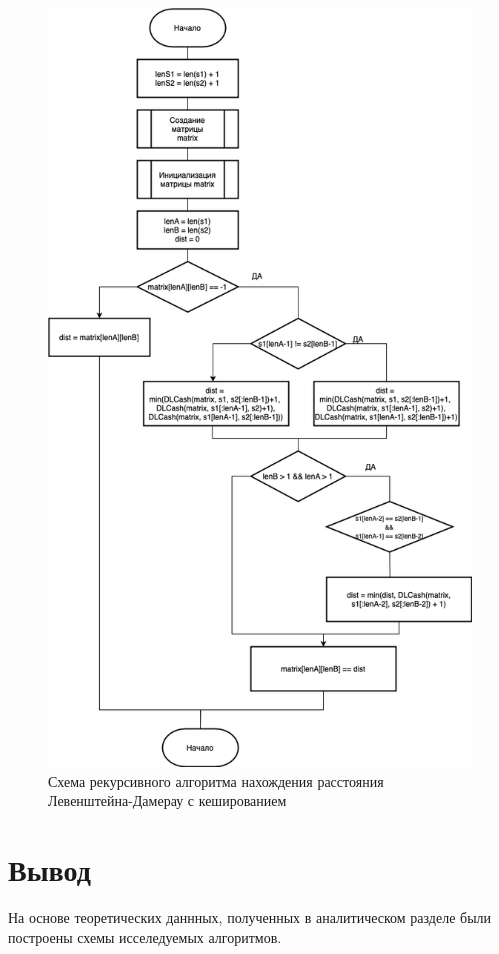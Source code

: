 \begin{figure}[h]
	\centering
	\includegraphics[width=0.8\linewidth]{img/DLC.jpg}
	\caption{Схема рекурсивного алгоритма нахождения расстояния Левенштейна-Дамерау с кешированием}
	\label{fig:mpr}
\end{figure}

\clearpage

\section{Вывод}
На основе теоретических даннных, полученных в аналитическом разделе были построены схемы исселедуемых алгоритмов.
